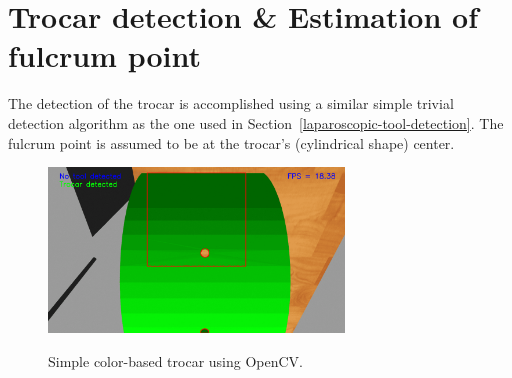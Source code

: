 %
\section{Trocar detection \& Estimation of fulcrum point}
%
The detection of the trocar is accomplished using a similar simple trivial detection algorithm as the one used in Section~\ref{laparoscopic-tool-detection}. The fulcrum point is assumed to be at the trocar's (cylindrical shape) center. 

\begin{center}
\begin{figure}[htbp]
\centering
\includegraphics[width=0.7\textwidth]{images/opencv-trocar-detection.png}\\
\caption{Simple color-based trocar using OpenCV.}
\end{figure}
\end{center}
